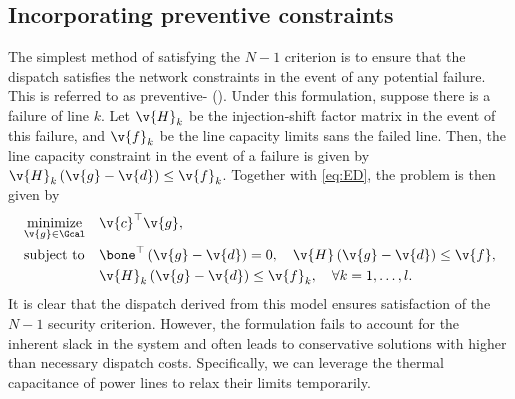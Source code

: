 \subsection{Incorporating preventive constraints}
The simplest method of satisfying the $N-1$ criterion is to ensure that the dispatch satisfies the network constraints in the event of any potential failure. This is referred to as preventive-\SCED{} (\PSCED{}). Under this formulation, suppose there is a failure of line $k$. Let $\v{H}_k$ be the injection-shift factor matrix in the event of this failure, and $\v{f}_k$ be the line capacity limits sans the failed line. Then, the line capacity constraint in the event of a failure is given by $\v{H}_k \left( \v{g} - \v{d} \right) \le \v{f}_k$. Together with \eqref{eq:ED}, the \PSCED{} problem is then given by
\begin{subequations}
\begin{align}
    &\underset{\v{g} \in \Gcal}{\text{minimize}} && \v{c}^\top \v{g}, \label{eq:PSCED.obj} \\
    &\text{subject to} && \bone^\top \left(\v{g} - \v{d}\right) = 0, \quad \v{H} \left( \v{g} - \v{d} \right) \le \v{f}, \label{eq:PSCED.nom} \\
    &&& \v{H}_k \left( \v{g} - \v{d} \right) \le \v{f}_k, \quad \forall k = 1, \dots, l. \label{eq:PSCED.cont}
\end{align}
\label{eq:PSCED}
\end{subequations}
It is clear that the dispatch derived from this model ensures satisfaction of the $N-1$ security criterion. However, the formulation fails to account for the inherent slack in the system and often leads to conservative solutions with higher than necessary dispatch costs. Specifically, we can leverage the thermal capacitance of power lines to relax their limits temporarily.

